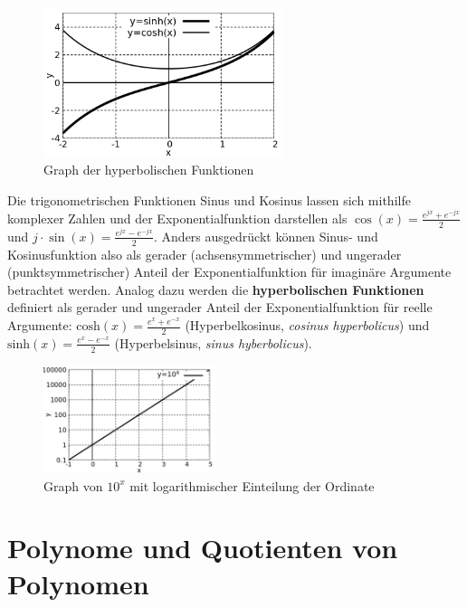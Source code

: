 \begin{minipage}[t]{1\textwidth}
    \begin{figure}
        \centering
        \includegraphics[width=7cm]{./gnuplot/base-function-hyp}
        \caption{Graph der hyperbolischen Funktionen}
        \label{fig:ExBaseFunHyperbolic}
    \end{figure}
    Die trigonometrischen Funktionen Sinus und Kosinus lassen sich mithilfe komplexer Zahlen und der Exponentialfunktion darstellen als $\cos(x) = \frac{e^{jx}+e^{-jx}}{2}$ und $j\cdot \sin(x) = \frac{e^{jx}-e^{-jx}}{2}$. Anders ausgedrückt können Sinus- und Kosinusfunktion also als gerader (achsensymmetrischer) und ungerader (punktsymmetrischer) Anteil der Exponentialfunktion für imaginäre Argumente betrachtet werden. Analog dazu werden die \textbf{hyperbolischen Funktionen} definiert als gerader und ungerader Anteil der Exponentialfunktion für reelle Argumente: $\text{cosh}(x) = \frac{e^x+e^{-x}}{2}$ (Hyperbelkosinus, \emph{cosinus hyperbolicus}) und $\text{sinh}(x) = \frac{e^x-e^{-x}}{2}$ (Hyperbelsinus, \emph{sinus hyberbolicus}).
\end{minipage}


\begin{figure}
    \centering
    \includegraphics[width=0.45\textwidth]{./gnuplot/log-scale-plot}
    \caption[Logarithmische Achseneinteilung]{Graph von $10^x$ mit logarithmischer Einteilung der Ordinate}
    \label{fig:LogScalePlot}
\end{figure}

\clearpage

\section{Polynome und Quotienten von Polynomen}

